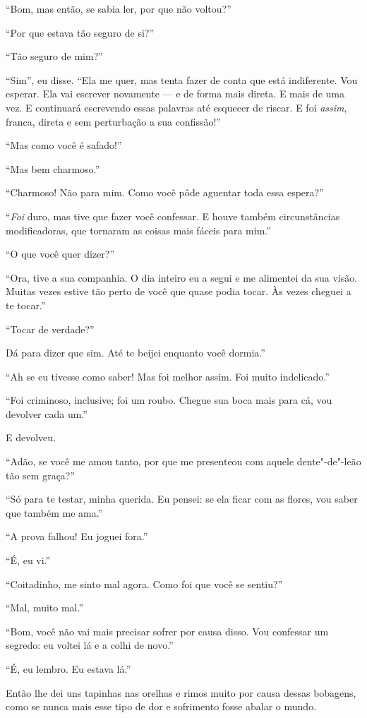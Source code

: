 “Bom, mas então, se sabia ler, por que não voltou?”

“Por que estava tão seguro de si?”

“Tão seguro de mim?”

“Sim”, eu disse. “Ela me quer, mas tenta fazer de conta que está indiferente. Vou
esperar. Ela vai escrever novamente --- e de forma mais direta. E mais de uma vez. E
continuará escrevendo essas palavras até esquecer de riscar. E foi
\textit{assim}, franca, direta e sem perturbação a sua confissão!”     

“Mas como você é safado!”

“Mas bem charmoso.”

“Charmoso! Não para mim. Como você pôde
aguentar toda essa espera?”

``\textit{Foi} duro, mas tive que fazer você confessar. E houve também
circunstâncias modificadoras, que tornaram as coisas mais fáceis para
mim.''

“O que você quer dizer?”

“Ora, tive a sua companhia. O dia inteiro eu a segui e me alimentei da sua visão. Muitas
vezes estive tão perto de você que quase podia tocar. Às vezes cheguei a te tocar.”

“Tocar de verdade?”

Dá para dizer que sim. Até te beijei enquanto você dormia.”

“Ah se eu tivesse como saber! Mas foi melhor assim. Foi muito indelicado.”

“Foi criminoso, inclusive; foi um roubo. Chegue sua boca mais para cá, vou devolver cada um.”

E devolveu.

“Adão, se você me amou tanto, por que me presenteou com aquele dente"-de"-leão
tão sem graça?”

“Só para te testar, minha querida. Eu pensei: se ela ficar com as flores, vou saber
que também me ama.”

“A prova falhou! Eu joguei fora.”

“É, eu vi.”

“Coitadinho, me sinto mal agora. Como foi que você se sentiu?”

“Mal, muito mal.”

“Bom, você não vai mais precisar sofrer por causa disso. Vou confessar um segredo: eu
voltei lá e a colhi de novo.”

“É, eu lembro. Eu estava lá.”

Então lhe dei uns tapinhas nas orelhas e rimos muito por causa dessas bobagens, 
como se nunca mais esse tipo de dor e sofrimento fosse abalar o mundo.

